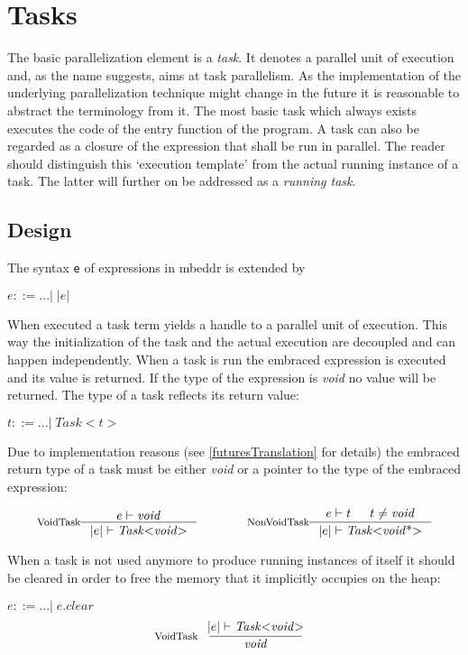 \section{Tasks}
The basic parallelization element is a \textit{task}. It denotes a parallel unit of execution and, as the name suggests, aims at task parallelism. As the implementation of the underlying parallelization technique might change in the future it is reasonable to abstract the terminology from it. The most basic task which always exists executes the code of the entry function of the program. A task can also be regarded as a closure of the expression that shall be run in parallel. The reader should distinguish this `execution template' from the actual running instance of a task. The latter will further on be addressed as a \textit{running task}.
\subsection{Design}
\label{tasksDesign}
The syntax \texttt{e} of expressions in mbeddr is extended by

$e ::= ...|\;\mathit{|e|}$

When executed a task term yields a handle to a parallel unit of execution. This way the initialization of the task and the actual execution are decoupled and can happen independently. When a task is run the embraced expression is executed and its value is returned. If the type of the expression is \textit{void} no value will be returned. The type of a task reflects its return value:

$t ::= ... |\;\mathit{Task{<}t{>}}$

Due to implementation reasons (see \ref{futuresTranslation} for details) the embraced return type of a task must be either \textit{void} or a pointer to the type of the embraced expression:

\begin{align*}
\inference*[VoidTask]{e |- \mathit{void}}{|e| |- \mathit{Task{<}void{>}}} 
\qquad\qquad
\inference*[NonVoidTask]{e |- t & t \neq \mathit{void}}{|e| |- \mathit{Task{<}void{\text{*}}{>}}}
\end{align*}

When a task is not used anymore to produce running instances of itself it should be cleared in order to free the memory that it implicitly occupies on the heap:

$e ::= ...|\;e.\mathit{clear}$
\begin{align*}
\inference*[VoidTask]{|e| |- \mathit{Task{<}void{>}}}{\qquad\mathit{void}\qquad} 
\end{align*}

